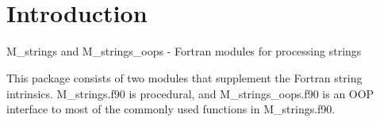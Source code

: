     

    \hypertarget{index_Introduction}{}\section{Introduction}\label{index_Introduction}
\begin{DoxyVerb} M_strings and M_strings_oops - Fortran modules for processing strings

 This package consists of two modules that supplement the
 Fortran string intrinsics. M_strings.f90 is procedural, and
 M_strings_oops.f90 is an OOP interface to most of the commonly used
 functions in M_strings.f90.
\end{DoxyVerb}


      